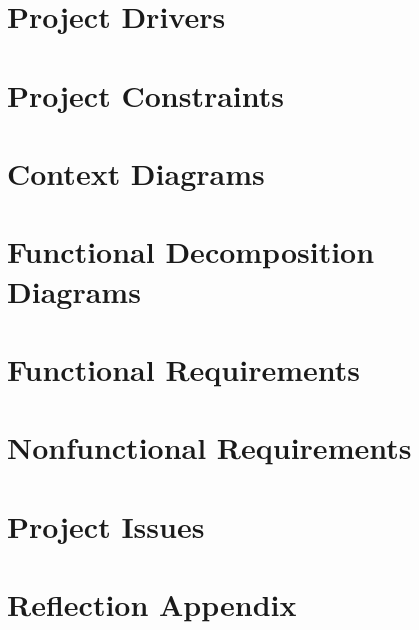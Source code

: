 \documentclass{article}
\begin{document}
\begin{large}
\section{Project Drivers}




\section{Project Constraints}





\section{Context Diagrams}







\section{Functional Decomposition Diagrams}







\section{Functional Requirements}

  



\section{Nonfunctional Requirements}






\section{Project Issues}






\appendix
\section{Reflection Appendix}





\end{large}
\end{document}
